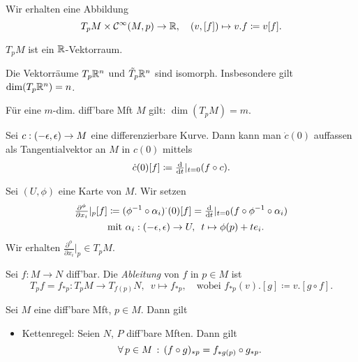 \documentclass{cheat-sheet}
\newcommand{\vinterval}{\ointerval{-\epsilon}{\epsilon}} %
\newcommand{\Cont}{\mathcal{C}} %
\begin{document}
\begin{bem}
  Wir erhalten eine Abbildung
  \[
    T_p M \times \Cont^\infty(M, p) \to \R, \quad
    (v, [f]) \mapsto v.f \coloneqq v[f].
  \]
\end{bem}

\begin{bem}
  $T_p M$ ist ein $\mathbb{R}$-Vektorraum.
\end{bem}

\begin{satz}
  Die Vektorräume $T_p \mathbb{R}^n$ und $\tilde{T}_p \mathbb{R}^n$ sind isomorph. Insbesondere gilt $\dim(T_p \mathbb{R}^n) = n$.
\end{satz}

\begin{kor}
  Für eine $m$-dim. diff'bare Mft $M$ gilt: $\dim(T_p M) = m$.
\end{kor}

\begin{bem}
  Sei $c : \vinterval \to M$ eine differenzierbare Kurve. Dann kann man $\dot{c}(0)$ auffassen als Tangentialvektor an $M$ in $c(0)$ mittels
  \[ \dot{c}(0)[f] \coloneqq \tfrac{\mathrm{d}}{\mathrm{d} t}|_{t=0} (f \circ c). \]
\end{bem}

\begin{bem}
  Sei $(U, \phi)$ eine Karte von $M$. Wir setzen
  \begin{align*}
    \tfrac{\partial^{\phi}}{\partial x_i}|_p [f] & \coloneqq (\phi^{-1} \circ \alpha_i)^{{\cdot}} (0) [f] = \tfrac{\mathrm{d}}{\mathrm{d} t}|_{t=0} (f \circ \phi^{-1} \circ \alpha_i)\\
    & \text{mit } \alpha_i : \left( -\epsilon, \epsilon \right) \to U, \enspace t \mapsto \phi(p) + t e_i.
  \end{align*}
  Wir erhalten $\tfrac{\partial^{\phi}}{\partial x_i}|_p \in T_p M$.
\end{bem}

\begin{defn}
  Sei $f : M \to N$ diff'bar. Die \emph{Ableitung} von $f$ in $p \in M$ ist %
  \[
    T_p f \!=\! f_{*p} : T_p M \to T_{f(p)} N, \enspace v \mapsto f_{*p}, \quad
     \text{wobei } f_{*p}(v).[g] \coloneqq v.[g \circ f].
  \]
\end{defn}

\begin{lem}
  Sei $M$ eine diff'bare Mft, $p \in M$. Dann gilt
  \begin{itemize}
    \item Kettenregel: Seien $N$, $P$ diff'bare Mften. Dann gilt
    \[ \forall \, {p \in M} \,:\, (f \circ g)_{*p} = f_{* g(p)} \circ g_{*p}. \]
  \end{itemize}
\end{lem}
\end{document}
